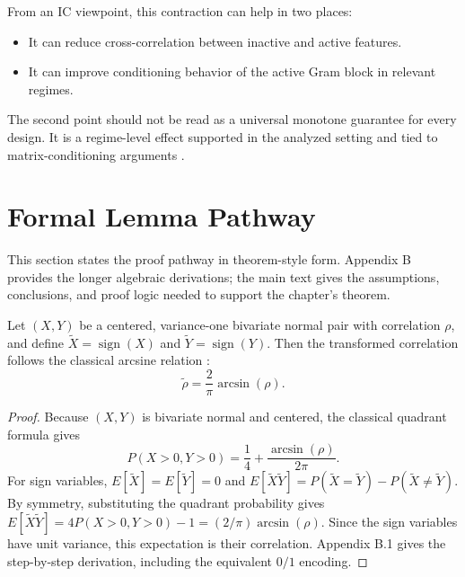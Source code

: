 From an IC viewpoint, this contraction can help in two places:
\begin{itemize}
    \item It can reduce cross-correlation between inactive and active features.
    \item It can improve conditioning behavior of the active Gram block in relevant regimes.
\end{itemize}

The second point should not be read as a universal monotone guarantee for every design. It is a regime-level effect supported in the analyzed setting and tied to matrix-conditioning arguments \autocites{JOrender2025Efficient,RAHorn2012Matrix}.

\section{Formal Lemma Pathway}

This section states the proof pathway in theorem-style form. Appendix B provides the longer algebraic derivations; the main text gives the assumptions, conclusions, and proof logic needed to support the chapter's theorem.

\begin{lemma}\label{lem:rq2-arcsin-map}
Let $(X,Y)$ be a centered, variance-one bivariate normal pair with correlation $\rho$, and define $\tilde{X}=\operatorname{sign}(X)$ and $\tilde{Y}=\operatorname{sign}(Y)$. Then the transformed correlation follows the classical arcsine relation \autocite{WFSheppard1899Application}:
\begin{equation}\label{eq:rq2-lemma1-arcsin-map}
\tilde{\rho} = \frac{2}{\pi}\arcsin(\rho).
\end{equation}
\end{lemma}

\begin{proof}
Because $(X,Y)$ is bivariate normal and centered, the classical quadrant formula gives \autocite{WFSheppard1899Application}
\begin{equation}\label{eq:rq2-proof-positive-quadrant-probability}
P(X>0,Y>0)=\frac{1}{4}+\frac{\arcsin(\rho)}{2\pi}.
\end{equation}
For sign variables, $E[\tilde{X}]=E[\tilde{Y}]=0$ and
$E[\tilde{X}\tilde{Y}]=P(\tilde{X}=\tilde{Y})-P(\tilde{X}\neq\tilde{Y})$.
By symmetry, substituting the quadrant probability gives
$E[\tilde{X}\tilde{Y}]=4P(X>0,Y>0)-1=(2/\pi)\arcsin(\rho)$.
Since the sign variables have unit variance, this expectation is their correlation. Appendix B.1 gives the step-by-step derivation, including the equivalent $0/1$ encoding.
\end{proof}

